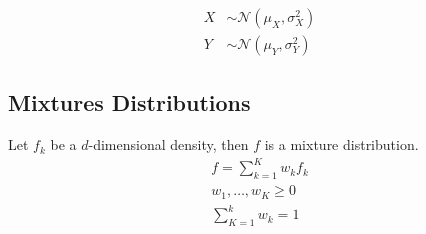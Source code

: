 \newpar{}
\begin{align*}
    X & \sim\mathcal{N}(\mu_X, \sigma_X^2) \\
    Y & \sim\mathcal{N}(\mu_Y, \sigma_Y^2)
\end{align*}

\subsection{Mixtures Distributions}
Let $f_k$ be a $d$-dimensional density, then $f$ is a mixture distribution.
\begin{gather*}
    f = \sum_{k=1}^{K} w_k f_k \\
    w_1, \ldots, w_K \geq 0 \\
    \sum_{K=1}^{k}w_k = 1
\end{gather*}
